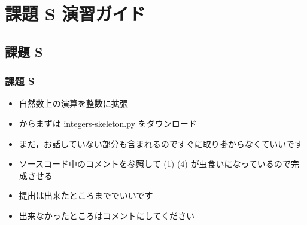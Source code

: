 %
%
\section{課題 S 演習ガイド}
\subsection{課題 S}
\begin{frame}[containsverbatim, shrink, label=quizS]
\frametitle{課題 S}
  \begin{itemize}
\item 自然数上の演算を整数に拡張
\item \href{https://sites.google.com/presystems.xyz/elementarycs/top}{} からまずは integers-skeleton.py をダウンロード
\item まだ，お話していない部分も含まれるのですぐに取り掛からなくていいです
\item ソースコード中のコメントを参照して (1)-(4) が虫食いになっているので完成させる
\item 提出は出来たところまででいいです
\item 出来なかったところはコメントにしてください
  \end{itemize}
\end{frame}
